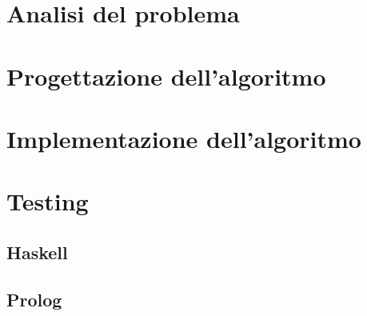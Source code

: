 \documentclass{report}
\begin{document}
	\chapter{Analisi del problema}
	
	
	\chapter{Progettazione dell'algoritmo}
	
	\chapter{Implementazione dell'algoritmo}

    \chapter{Testing}
    \section{Haskell}
    \section{Prolog}
	
\end{document}
